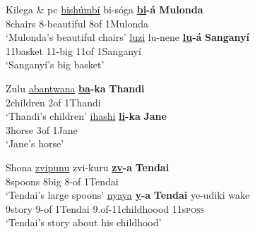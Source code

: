 \documentclass[output=paper
,modfonts
,nonflat]{langsci/langscibook}
\begin{document}
\begin{exe}
	\ex Kilega \citep{Kinyalolo1991} \& pc \label{ex:9}
	\xlist
	\ex 
	\gll \underline{bishúmbí}   bi-sóga        \textbf{\underline{bi}-á}   \textbf{Mulonda} \\
	8chairs       8-beautiful     8of    1Mulonda\\
	\glt `Mulonda’s beautiful chairs'  	
	\ex 
	\gll \underline{luzi}               lu-nene   \textbf{\underline{lu}-á}    \textbf{Sanganyí}\\
	11basket   11-big    11of      1Sanganyí\\
	\glt `Sanganyí’s big basket'
	\endxlist
\end{exe}
\begin{exe}
	\ex Zulu \label{ex:10}
	\xlist
	\ex 
	\gll \underline{abantwana} \textbf{\underline{ba}{}-ka}   \textbf{Thandi} \\
	2children     2of        1Thandi\\
	\glt `Thandi’s children'  	
	\ex 
	\gll \underline{ihashi}   \textbf{\underline{li}{}-ka}  \textbf{Jane}\\
	3horse 3of     1Jane\\
	\glt `Jane’s horse'
	\endxlist
\end{exe}
\begin{exe}
	\ex Shona \label{ex:11}
	\xlist
	\ex 
	\gll \underline{zvipunu}   zvi-kuru \textbf{\underline{zv}{}-a}     \textbf{Tendai} \\
	8spoons   8big       8-of    1Tendai\\
	\glt `Tendai’s large spoons'  	
	\ex 
	\gll \underline{nyaya}   \textbf{\underline{y}{}-a}     \textbf{Tendai}   ye-udiki             wake\\
	9story   9-of    1Tendai   9.of-11childhoood     11s\textsc{poss}\\
	\glt `Tendai's story about his childhood'
	\endxlist
\end{exe}
\end{document}
